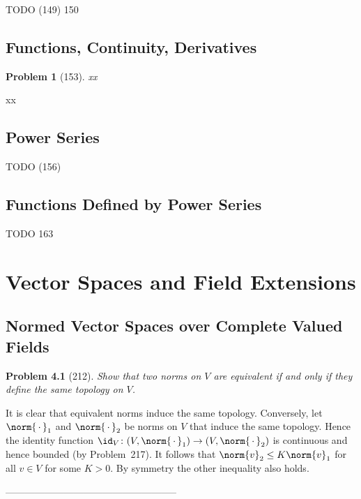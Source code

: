 \documentclass[a4paper, 11pt]{memoir}
\theoremstyle{plaincustomnumber}
\newtheorem{problem}{Problem}
\theoremstyle{changedotbreakcustomnumber}
\begin{document}
TODO (149) 150

\section{Functions, Continuity, Derivatives}

\begin{problem}[153]
    xx
\end{problem}

\begin{solution}
    xx
\end{solution}


\addtocounter{section}{1}
\section{Power Series}

TODO (156)


\section{Functions Defined by Power Series}

TODO 163


\chapter{Vector Spaces and Field Extensions}

\section{Normed Vector Spaces over Complete Valued Fields}

\begin{problem}[212]
    Show that two norms on $V$ are equivalent if and only if they define the same topology on $V$.
\end{problem}

\begin{solution}
    It is clear that equivalent norms induce the same topology. Conversely, let $\norm{\,\cdot\,}_1$ and $\norm{\,\cdot\,}_2$ be norms on $V$ that induce the same topology. Hence the identity function $\id_V \colon (V, \norm{\,\cdot\,}_1) \to (V, \norm{\,\cdot\,}_2)$ is continuous and hence bounded (by Problem~217). It follows that $\norm{v}_2 \leq K \norm{v}_1$ for all $v \in V$ for some $K > 0$. By symmetry the other inequality also holds.
\end{solution}


-----------------------------------------------------
\end{document}
